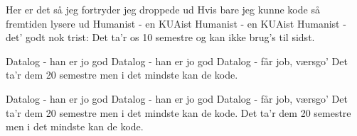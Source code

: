 \documentclass[a4paper,11pt]{article}
\begin{document}
\begin{song}
{        Her er det så jeg fortryder jeg droppede ud
        Hvis bare jeg kunne kode så fremtiden lysere ud
    }
     {
        Humanist - en KUAist
        Humanist - en KUAist
        Humanist - det’ godt nok trist:
        Det ta’r os 10 semestre
        og kan ikke brug’s til sidst.
    }


     {
        Datalog - han er jo god
        Datalog - han er jo god
        Datalog - får job, værsgo’
        Det ta’r dem 20 semestre
        men i det mindste kan de kode.
    }

     {
        Datalog - han er jo god
        Datalog - han er jo god
        Datalog - får job, værsgo’
        Det ta’r dem 20 semestre
        men i det mindste kan de kode.
        Det ta’r dem 20 semestre
        men i det mindste kan de kode.
    }
\end{song}
\end{document}
